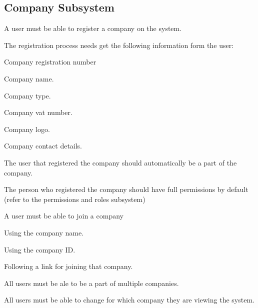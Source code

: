 \documentclass{article}
\begin{document}
	\subsection*{Company Subsystem}	
	\begin{list}{R.}{}
		\item A user must be able to register a company on the system.
		\item The registration process needs get the following information form the user: 
		\begin{list}{R.}{}
			\item Company registration number
			\item Company name.
			\item Company type.
			\item Company vat number.
			\item Company logo.
			\item Company contact details.
		\end{list} 
		\item The user that registered the company should automatically be a part of the company.
		\item The person who registered the company should have full permissions by default (refer to the permissions and roles subsystem)
		\item A user must be able to join a company
		\begin{list}{R.}{}
			\item Using the company name.
			\item Using the company ID.
			\item Following a link for joining that company.
		\end{list} 
		\item All users must be ale to be a part of multiple companies.
		\item All users must be able to change for which company they are viewing the system.
	\end{list}
	
\end{document}
